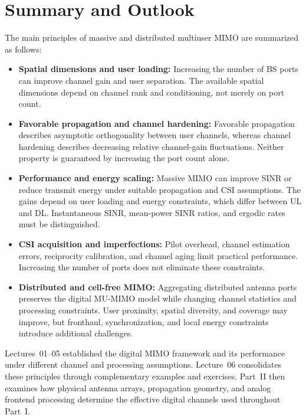 \section*{Summary and Outlook}
The main principles of massive and distributed multiuser MIMO are summarized as follows:
\begin{itemize}
	\item \textbf{Spatial dimensions and user loading:} Increasing the number of BS ports can improve channel gain and user separation. The available spatial dimensions depend on channel rank and conditioning, not merely on port count.
	
	\item \textbf{Favorable propagation and channel hardening:} Favorable propagation describes asymptotic orthogonality between user channels, whereas channel hardening describes decreasing relative channel-gain fluctuations. Neither property is guaranteed by increasing the port count alone.
	
	\item \textbf{Performance and energy scaling:} Massive MIMO can improve SINR or reduce transmit energy under suitable propagation and CSI assumptions. The gains depend on user loading and energy constraints, which differ between UL and DL. Instantaneous SINR, mean-power SINR ratios, and ergodic rates must be distinguished.
	
	\item \textbf{CSI acquisition and imperfections:} Pilot overhead, channel estimation errors, reciprocity calibration, and channel aging limit practical performance. Increasing the number of ports does not eliminate these constraints.
	
	\item \textbf{Distributed and cell-free MIMO:} Aggregating distributed antenna ports preserves the digital MU-MIMO model while changing channel statistics and processing constraints. User proximity, spatial diversity, and coverage may improve, but fronthaul, synchronization, and local energy constraints introduce additional challenges.
\end{itemize}

Lectures~01--05 established the digital MIMO framework and its performance under different channel and processing assumptions. Lecture~06 consolidates these principles through complementary examples and exercises. Part~II then examines how physical antenna arrays, propagation geometry, and analog frontend processing determine the effective digital channels used throughout Part~I.


